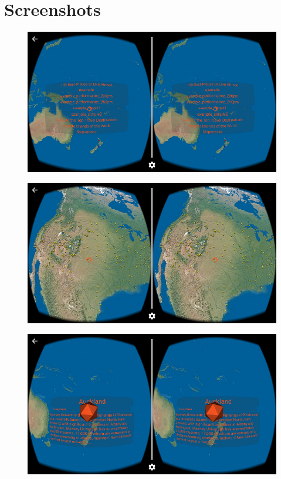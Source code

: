 \chapter{Screenshots}
\label{appendix-screenshots}

\begin{figure}[H]
	\centering
	\includegraphics[width=\textwidth, keepaspectratio]{Figures/Screenshots/kml-chooser.png}
	\decoRule
\end{figure}

\begin{figure}[H]
	\centering
	\includegraphics[width=\textwidth, keepaspectratio]{Figures/Screenshots/ray-spinner.png}
	\decoRule
\end{figure}

\begin{figure}[H]
	\centering
	\includegraphics[width=\textwidth, keepaspectratio]{Figures/Screenshots/placemark-obj-1.png}
	\decoRule
\end{figure}

